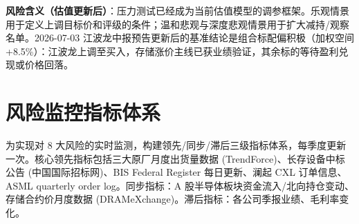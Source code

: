 \vspace{0.4em}
\noindent\textbf{风险含义（估值更新后）}：压力测试已经成为当前估值模型的调参框架。乐观情景用于定义上调目标价和评级的条件；温和悲观与深度悲观情景用于扩大减持/观察名单。2026-07-03 江波龙中报预告更新后的基准结论是组合标配偏积极（加权空间 +8.5\%）：江波龙上调至买入，存储涨价主线已获业绩验证，其余标的等待盈利兑现或价格回落。

\section{风险监控指标体系}

为实现对 8 大风险的实时监测，构建领先/同步/滞后三级指标体系，每季度更新一次。核心领先指标包括三大原厂月度出货量数据 (TrendForce)、长存设备中标公告 (中国国际招标网)、BIS Federal Register 每日更新、澜起 CXL 订单信息、ASML quarterly order log。同步指标：A 股半导体板块资金流入/北向持仓变动、存储合约价月度数据 (DRAMeXchange)。滞后指标：各公司季报业绩、毛利率变化。

